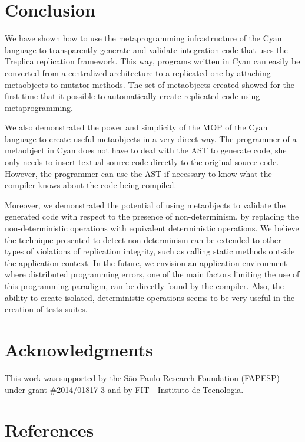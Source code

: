 \documentclass[preprint,review]{elsarticle}
\begin{document}


\section{Conclusion}
\label{conclusion}

We have  shown how  to use the  metaprogramming infrastructure  of the
Cyan language to transparently  generate and validate integration code
that  uses the  Treplica  replication framework.   This way,  programs
written  in   Cyan  can  easily   be  converted  from   a  centralized
architecture to a  replicated one by attaching  metaobjects to mutator
methods.  The  set of  metaobjects created showed  for the  first time
that  it  possible  to  automatically  create  replicated  code  using
metaprogramming.

We also demonstrated  the power and simplicity of the  MOP of the Cyan
language  to create  useful metaobjects  in  a very  direct way.   The
programmer of a metaobject in Cyan does  not have to deal with the AST
to  generate  code, she  only  needs  to  insert textual  source  code
directly to the original source  code. However, the programmer can use
the AST  if necessary to know  what the compiler knows  about the code
being compiled.

Moreover,  we  demonstrated  the  potential of  using  metaobjects  to
validate  the  generated   code  with  respect  to   the  presence  of
non-determinism,  by replacing  the non-deterministic  operations with
equivalent  deterministic   operations.   We  believe   the  technique
presented to detect non-determinism can  be extended to other types of
violations of  replication integrity,  such as calling  static methods
outside  the  application context.   In  the  future, we  envision  an
application environment  where distributed programming errors,  one of
the main factors limiting the use of this programming paradigm, can be
directly found by the compiler.  Also, the ability to create isolated,
deterministic operations  seems to be  very useful in the  creation of
tests suites.


\section*{Acknowledgments}

This  work  was  supported  by the  S\~ao  Paulo  Research  Foundation
(FAPESP)  under  grant  \#2014/01817-3  and  by  FIT  -  Instituto  de
Tecnologia.


\section*{References}



\end{document}
